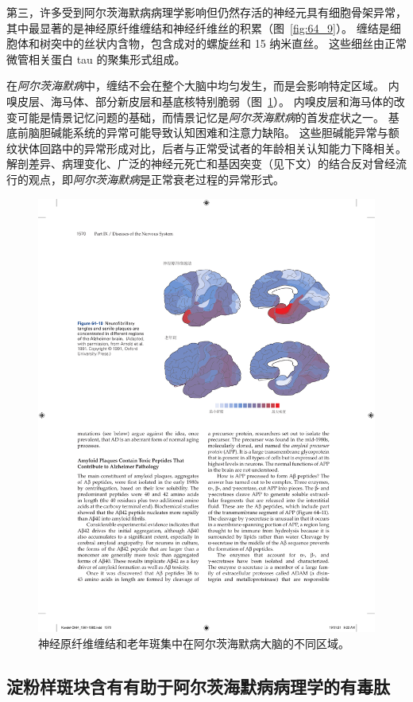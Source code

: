 第三，许多受到阿尔茨海默病病理学影响但仍然存活的神经元具有细胞骨架异常，其中最显著的是神经原纤维缠结和神经纤维丝的积累（图~\ref{fig:64_9}）。
缠结是细胞体和树突中的丝状内含物，包含成对的螺旋丝和 15 纳米直丝。
这些细丝由正常微管相关蛋白 tau 的聚集形式组成。


在\textit{阿尔茨海默病}中，缠结不会在整个大脑中均匀发生，而是会影响特定区域。
内嗅皮层、海马体、部分新皮层和基底核特别脆弱（图~\ref{fig:64_10}）。
内嗅皮层和海马体的改变可能是情景记忆问题的基础，而情景记忆是\textit{阿尔茨海默病}的首发症状之一。
基底前脑胆碱能系统的异常可能导致认知困难和注意力缺陷。
这些胆碱能异常与额纹状体回路中的异常形成对比，后者与正常受试者的年龄相关认知能力下降相关。
解剖差异、病理变化、广泛的神经元死亡和基因突变（见下文）的结合反对曾经流行的观点，即\textit{阿尔茨海默病}是正常衰老过程的异常形式。


\begin{figure}[htbp]
	\centering
	\includegraphics[width=0.85\linewidth]{chap64/fig_64_10}
	\caption{神经原纤维缠结和老年斑集中在阿尔茨海默病大脑的不同区域\cite{arnold1991topographical}。}
	\label{fig:64_10}
\end{figure}



\subsection{淀粉样斑块含有有助于阿尔茨海默病病理学的有毒肽}

